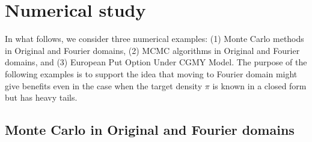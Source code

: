 \documentclass[preprint, 3p, authoryear]{elsarticle}
\newcommand{\E}{\mathsf{E}}
\theoremstyle{definition}
\begin{document}
\section{Numerical study}
\label{sec:num}
In what follows, we consider three numerical examples:
(1) Monte Carlo methods in Original and Fourier domains, 
(2) MCMC algorithms in Original and Fourier domains, and
(3) European Put Option Under CGMY Model.
The purpose of the following examples is to support the idea that 
moving to Fourier domain might give benefits even in the case when 
the target density $\pi$ is known in a closed form but has heavy tails.

\subsection{Monte Carlo in Original and Fourier domains}
\end{document}
